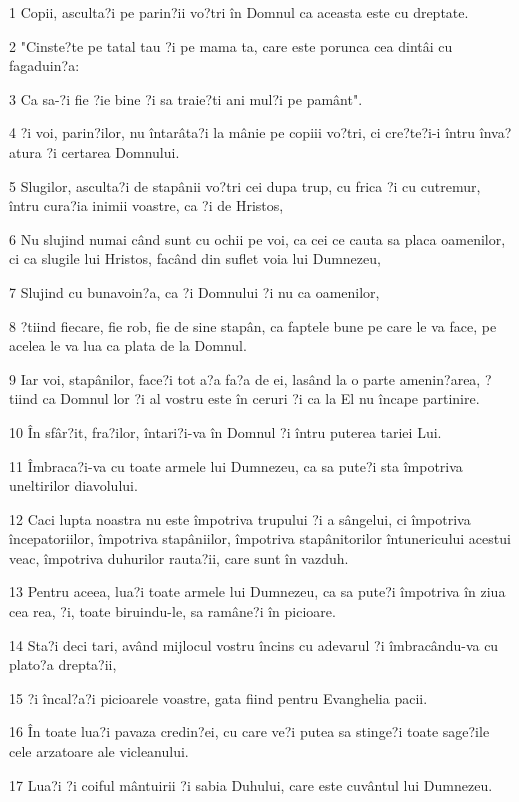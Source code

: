 \par 1 Copii, asculta?i pe parin?ii vo?tri în Domnul ca aceasta este cu dreptate.
\par 2 "Cinste?te pe tatal tau ?i pe mama ta, care este porunca cea dintâi cu fagaduin?a:
\par 3 Ca sa-?i fie ?ie bine ?i sa traie?ti ani mul?i pe pamânt".
\par 4 ?i voi, parin?ilor, nu întarâta?i la mânie pe copiii vo?tri, ci cre?te?i-i întru înva?atura ?i certarea Domnului.
\par 5 Slugilor, asculta?i de stapânii vo?tri cei dupa trup, cu frica ?i cu cutremur, întru cura?ia inimii voastre, ca ?i de Hristos,
\par 6 Nu slujind numai când sunt cu ochii pe voi, ca cei ce cauta sa placa oamenilor, ci ca slugile lui Hristos, facând din suflet voia lui Dumnezeu,
\par 7 Slujind cu bunavoin?a, ca ?i Domnului ?i nu ca oamenilor,
\par 8 ?tiind fiecare, fie rob, fie de sine stapân, ca faptele bune pe care le va face, pe acelea le va lua ca plata de la Domnul.
\par 9 Iar voi, stapânilor, face?i tot a?a fa?a de ei, lasând la o parte amenin?area, ?tiind ca Domnul lor ?i al vostru este în ceruri ?i ca la El nu încape partinire.
\par 10 În sfâr?it, fra?ilor, întari?i-va în Domnul ?i întru puterea tariei Lui.
\par 11 Îmbraca?i-va cu toate armele lui Dumnezeu, ca sa pute?i sta împotriva uneltirilor diavolului.
\par 12 Caci lupta noastra nu este împotriva trupului ?i a sângelui, ci împotriva începatoriilor, împotriva stapâniilor, împotriva stapânitorilor întunericului acestui veac, împotriva duhurilor rauta?ii, care sunt în vazduh.
\par 13 Pentru aceea, lua?i toate armele lui Dumnezeu, ca sa pute?i împotriva în ziua cea rea, ?i, toate biruindu-le, sa ramâne?i în picioare.
\par 14 Sta?i deci tari, având mijlocul vostru încins cu adevarul ?i îmbracându-va cu plato?a drepta?ii,
\par 15 ?i încal?a?i picioarele voastre, gata fiind pentru Evanghelia pacii.
\par 16 În toate lua?i pavaza credin?ei, cu care ve?i putea sa stinge?i toate sage?ile cele arzatoare ale vicleanului.
\par 17 Lua?i ?i coiful mântuirii ?i sabia Duhului, care este cuvântul lui Dumnezeu.

